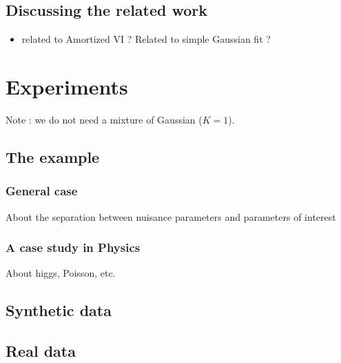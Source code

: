 \subsection{Discussing the related work} 

\begin{itemize}
    \item related to Amortized VI ? Related to simple Gaussian fit ?
\end{itemize}


\section{Experiments}

Note : we do not need a mixture of Gaussian ($K=1$).


\subsection{The example} 
\subsubsection{General case} 

About the separation between nuisance parameters and parameters of interest

\subsubsection{A case study in Physics} 

About higgs, Poisson, etc.


\subsection{Synthetic data}

\subsection{Real data}


